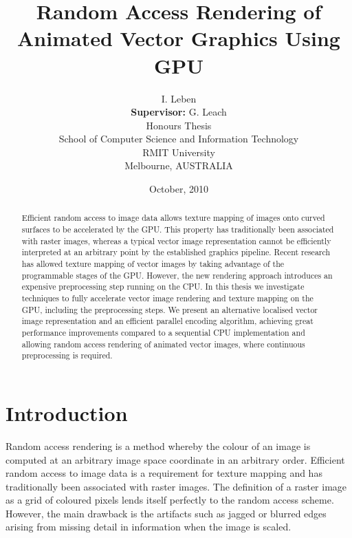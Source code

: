 \documentclass[11pt,a4paper,twoside]{article}
\newcommand{\student}{I. Leben}
\newcommand{\topic}{Random Access Rendering of Animated Vector Graphics Using GPU}
\begin{document}
\title{{\sc \topic}}
\author
{
{\sc \student}
\\[3mm] {\bf Supervisor:} {\sc G. Leach}
\\[5mm] Honours Thesis
\\[5mm] School of Computer Science and Information Technology
\\ RMIT University 
\\ Melbourne, AUSTRALIA
}
\date {October, 2010}
\maketitle

\begin{abstract}
Efficient random access to image data allows texture mapping of images onto curved surfaces to be accelerated by the GPU. This property has traditionally been associated with raster images, whereas a typical vector image representation cannot be efficiently interpreted at an arbitrary point by the established graphics pipeline. Recent research has allowed texture mapping of vector images by taking advantage of the programmable stages of the GPU. However, the new rendering approach introduces an expensive preprocessing step running on the CPU. In this thesis we investigate techniques to fully accelerate vector image rendering and texture mapping on the GPU, including the preprocessing steps. We present an alternative localised vector image representation and an efficient parallel encoding algorithm, achieving great performance improvements compared to a sequential CPU implementation and allowing random access rendering of animated vector images, where continuous preprocessing is required.
\end{abstract}

\newpage
\tableofcontents
\newpage

\pagestyle{fancy}

\section{Introduction}

Random access rendering is a method whereby the colour of an image is computed at an arbitrary image space coordinate in an arbitrary order. Efficient random access to image data is a requirement for texture mapping and has traditionally been associated with raster images. The definition of a raster image as a grid of coloured pixels lends itself perfectly to the random access scheme. However, the main drawback is the artifacts such as jagged or blurred edges arising from missing detail in information when the image is scaled.
\end{document}
